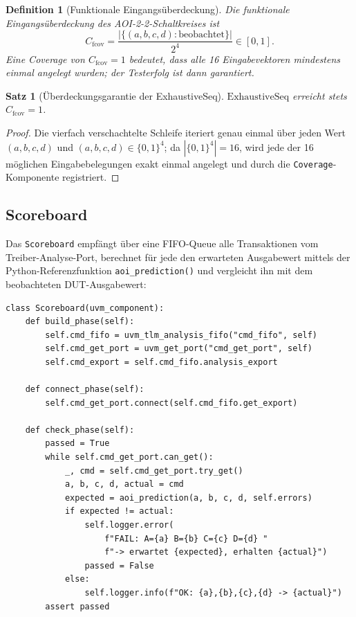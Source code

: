 ﻿\documentclass[12pt,a4paper]{report}
\newtheorem{definition}{Definition}[section]
\newtheorem{theorem}{Satz}[section]
\begin{document}
\begin{definition}[Funktionale Eingangsüberdeckung]
\label{def:func_coverage}
Die \emph{funktionale Eingangsüber\-deckung} des AOI-2-2-Schaltkreises ist
\[
    C_{\mathrm{fcov}} = \frac{|\{(a,b,c,d) : \text{beobachtet}\}|}{2^4} \in [0, 1].
\]
Eine Coverage von $C_{\mathrm{fcov}} = 1$ bedeutet, dass alle 16 Eingabevektoren
mindestens einmal angelegt wurden; der Testerfolg ist dann garantiert.
\end{definition}

\begin{theorem}[Überdeckungsgarantie der ExhaustiveSeq]
\label{thm:coverage_exhaustive}
$\mathrm{ExhaustiveSeq}$ erreicht stets $C_{\mathrm{fcov}} = 1$.
\end{theorem}

\begin{proof}
Die vierfach verschachtelte Schleife iteriert genau einmal über jeden Wert
$(a, b, c, d)$ und $(a, b, c, d) \in \{0,1\}^4$; da $|\{0,1\}^4| = 16$, wird jede der
16 möglichen Eingabebelegungen exakt einmal angelegt und durch die
\texttt{Coverage}-Komponente registriert.
\end{proof}

\subsection{Scoreboard}
\label{sssec:scoreboard}

Das \texttt{Scoreboard} empfängt über eine FIFO-Queue alle Transaktionen vom
Treiber-Analyse-Port, berechnet für jede den erwarteten Ausgabewert mittels
der Python-Referenzfunktion \texttt{aoi\_prediction()} und vergleicht ihn mit
dem beobachteten DUT-Ausgabewert:

\begin{lstlisting}[style=pythonstyle, caption={Scoreboard: Soll-Ist-Vergleich in der \texttt{check\_phase}}]
class Scoreboard(uvm_component):
    def build_phase(self):
        self.cmd_fifo = uvm_tlm_analysis_fifo("cmd_fifo", self)
        self.cmd_get_port = uvm_get_port("cmd_get_port", self)
        self.cmd_export = self.cmd_fifo.analysis_export

    def connect_phase(self):
        self.cmd_get_port.connect(self.cmd_fifo.get_export)

    def check_phase(self):
        passed = True
        while self.cmd_get_port.can_get():
            _, cmd = self.cmd_get_port.try_get()
            a, b, c, d, actual = cmd
            expected = aoi_prediction(a, b, c, d, self.errors)
            if expected != actual:
                self.logger.error(
                    f"FAIL: A={a} B={b} C={c} D={d} "
                    f"-> erwartet {expected}, erhalten {actual}")
                passed = False
            else:
                self.logger.info(f"OK: {a},{b},{c},{d} -> {actual}")
        assert passed
\end{lstlisting}
\end{document}
